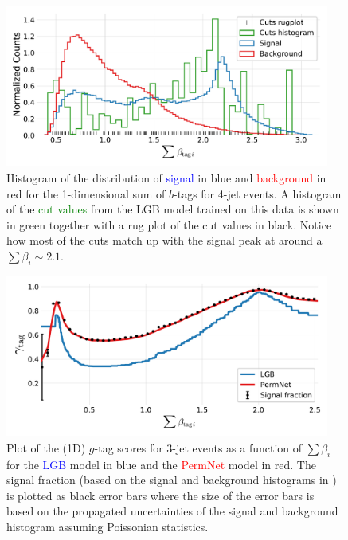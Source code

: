 \begin{figure}
  \includegraphics[width=0.95\textwidth, trim=10 10 10 20, clip]{figures/quarks/gtag_sum_method_njet=4-down_sample=1.00-ML_vars=vertex-selection=b-ejet_min=4-n_iter_RS_lgb=99-n_iter_RS_xgb=9-cdot_cut=0.90-version=19.pdf}
  \caption[1D LGB Model Cuts for 4-jets events]
          {Histogram of the distribution of \textcolor{blue}{signal} in blue and \textcolor{red}{background} in red for the 1-dimensional sum of $b$-tags for 4-jet events. A histogram of the \textcolor{green}{cut values} from the LGB model trained on this data is shown in green together with a rug plot of the cut values in black. Notice how most of the cuts match up with the signal peak at around a $\sum \beta_i \sim 2.1$.
          } 
  \label{fig:q:1d_sum_model_cuts_4j}
\end{figure}







\begin{figure}
  \includegraphics[width=0.95\textwidth, trim=10 10 10 10, clip]{figures/quarks/gtag_sum_models_njet=3-down_sample=1.00-ML_vars=vertex-selection=b-ejet_min=4-n_iter_RS_lgb=99-n_iter_RS_xgb=9-cdot_cut=0.90-version=19.pdf}
  \caption[1D Sum Models Predictions and Signal Fraction for 3-jets events]
          {Plot of the (1D) $g$-tag scores for 3-jet events as a function of $\sum \beta_i$ for the \textcolor{blue}{LGB} model in blue and the \textcolor{red}{PermNet} model in red. The signal fraction (based on the signal and background histograms in ) is plotted as black error bars where the size of the error bars is based on the propagated uncertainties of the signal and background histogram assuming Poissonian statistics. } 
  \label{fig:q:1d_sum_models_signal_fraction_3j}
\end{figure}

